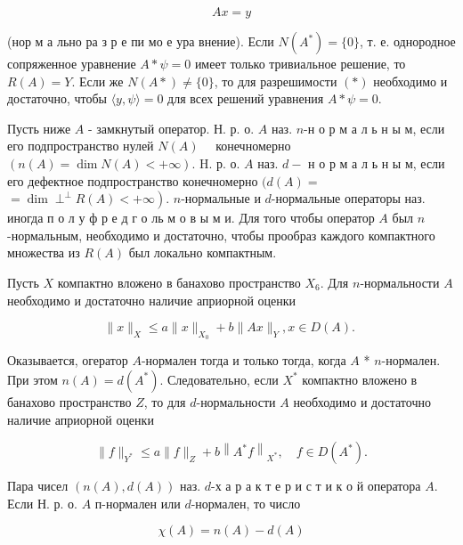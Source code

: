 \documentclass[10pt]{article}
\begin{document}
\[

A x=y

\]



(нор м а льно ра з р е пи мо е ура внение). Если $N\left(A^{*}\right)=\{0\}$, т. е. однородное сопряженное уравнение $A * \psi=0$ имеет только тривиальное решение, то $R(A)=Y$. Если же $N(A *) \neq\{0\}$, то для разрешимости $(*)$ необходимо и достаточно, чтобы $\langle y, \psi\rangle=0$ для всех решений уравнения $A * \psi=0$.



Пусть ниже $A$ - замкнутый оператор. Н. р. о. $A$ наз. $n$-н о р м а л ь н ы м, если его подпространство нулей $N(A) \quad$ конечномерно $(n(A)=\operatorname{dim} N(A)<+\infty)$. H. р. о. $A$ наз. $d-$ н о р м а л ь н ы м, если его дефектное подпространство конечномерно $(d(A)=$ $\left.=\operatorname{dim} \perp^{\perp} R(A)<+\infty\right)$. $n$-нормальные и $d$-нормальные операторы наз. иногда п о л у ф р е д г о ль м о в ы м и. Для того чтобы оператор $A$ был $n$-нормальным, необходимо и достаточно, чтобы прообраз каждого компактного множества из $R(A)$ был локально компактным.



Пусть $X$ компактно вложено в банахово пространство $X_{6}$. Для $n$-нормальности $A$ необходимо и достаточно наличие априорной оценки



\[

\|x\|_{X} \leqslant a\|x\|_{X_{0}}+b\|A x\|_{Y}, x \in D(A) \text {. }

\]



Оказывается, огератор $A$-нормален тогда и только тогда, когда $A$ * $n$-нормален. При этом $n(A)=d\left(A^{*}\right)$. Следовательно, если $X^{*}$ компактно вложено в банахово пространство $Z$, то для $d$-нормальности $A$ необходимо и достаточно наличие априорной оценки



\[

\|f\|_{Y^{*}} \leqslant a\|f\|_{Z}+b\left\|A^{*} f\right\|_{X^{*}}, \quad f \in D\left(A^{*}\right) .

\]



Пара чисел $(n(A), d(A))$ наз. $d$-х а р а к т е р и с т и к о й оператора $A$. Если Н. р. о. $A$ п-нормален или $d$-нормален, то число



\[

\chi(A)=n(A)-d(A)

\]
\end{document}
